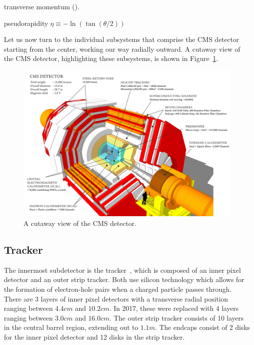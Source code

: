 transverse momentum (\pt).

pseudorapidity $\eta \equiv -\ln (\tan (\theta/2))$

Let us now turn to the individual subsystems that comprise the CMS detector
starting from the center, working our way radially outward. A cutaway view of
the CMS detector, highlighting these subsystems, is shown in
Figure~\ref{fig:cmsdetector}.

\begin{figure}[!htbp]
    \centering
    \includegraphics[width=0.99\linewidth]{figs/misc/cms.png}
    \caption{
        A cutaway view of the CMS detector.
    }
    \label{fig:cmsdetector}
\end{figure}

\FloatBarrier

\subsection{Tracker}

The innermost subdetector is the
tracker~\cite{CMS:TRK11001,CMS:Dominguez1481838}, which is composed of an
inner pixel detector and an outer strip tracker. Both use silicon technology
which allows for the formation of electron-hole pairs when a charged particle
passes through.
There are 3 layers of inner
pixel detectors with a transverse radial position ranging between $4.4\unit{cm}$ and $10.2\unit{cm}$. In 2017,
these were replaced with 4 layers ranging between $3.0\unit{cm}$ and $16.0\unit{cm}$.
The outer strip tracker consists of 10 layers in the central barrel region, extending
out to $1.1\unit{m}$. The endcaps consist of 2 disks for the inner pixel detector
and 12 disks in the strip tracker.


